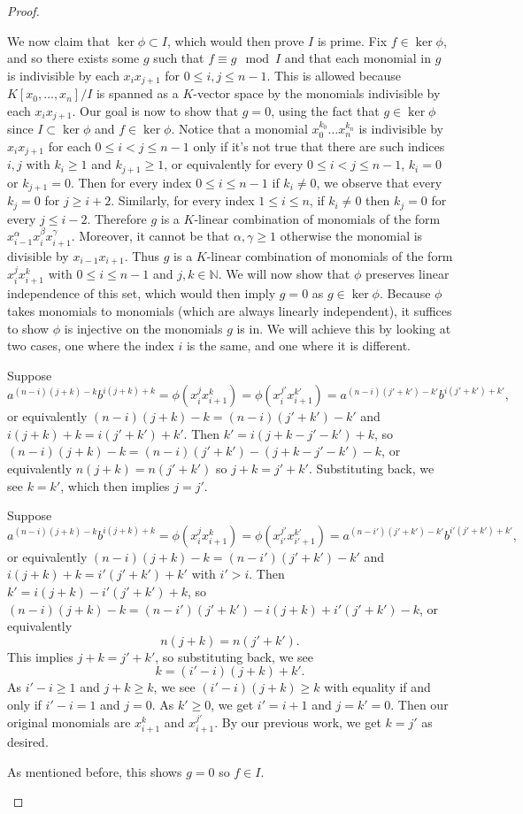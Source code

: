 \documentclass{article}
\newcommand{\N}{\mathbb{N}}
\theoremstyle{definition} %
\begin{document}
\begin{proof}
\begin{enumerate}[(a)]
        We now claim that $\ker \phi \subset I$, which would then prove $I$ is prime. Fix $f\in \ker \phi$, and so there exists some $g$ such that $f\equiv g \mod I$ and that each monomial in $g$ is indivisible by each $x_ix_{j+1}$ for $0\le i,j\le n-1$. This is allowed because $K[x_0,\dots, x_n]/I$ is spanned as a $K$-vector space by the monomials indivisible by each $x_ix_{j+1}$. Our goal is now to show that $g=0$, using the fact that $g\in \ker \phi$ since $I\subset \ker \phi$ and $f\in \ker \phi$. Notice that a monomial $x_0^{k_0} \dots x_n ^{k_n}$ is indivisible by $x_i x_{j+1}$ for each $0\le i < j \le n-1$ only if it's not true that there are such indices $i,j$ with $k_i \ge 1$ and $k_{j+1}\ge 1$, or equivalently for every $0\le i<j\le n-1$, $k_i = 0$ or $k_{j+1}=0$. Then for every index $0\le i \le n-1$ if $k_i\ne 0$, we observe that every $k_j=0$ for $j\ge i+2$. Similarly, for every index $1\le i \le n$, if $k_i \ne 0$ then $k_j = 0$ for every $j\le i-2$. Therefore $g$ is a $K$-linear combination of monomials of the form $x_{i-1}^ \alpha x_i ^\beta x_{i+1}^\gamma$. Moreover, it cannot be that $\alpha, \gamma \ge 1$ otherwise the monomial is divisible by $x_{i-1} x_{i+1}$. Thus $g$ is a $K$-linear combination of monomials of the form $x_i^j x_{i+1}^k$ with $0\le i \le n-1$ and $j,k \in \N$. We will now show that $\phi$ preserves linear independence of this set, which would then imply $g=0$ as $g\in \ker \phi$. Because $\phi$ takes monomials to monomials (which are always linearly independent), it suffices to show $\phi$ is injective on the monomials $g$ is in. We will achieve this by looking at two cases, one where the index $i$ is the same, and one where it is different.

        \vspace{0.1in}
        Suppose \[
        a^{(n-i)(j+k)-k}b^{i(j+k)+k}=\phi(x_i^j x_{i+1}^k)= \phi(x_i^{j'} x_{i+1}^{k'}) = a^{(n-i)(j'+k')-k'}b^{i(j'+k')+k'},
        \]
        or equivalently $(n-i)(j+k)-k = (n-i)(j'+k')-k'$ and $i(j+k)+k = i(j'+k')+k'$. Then $k'=i(j+k-j'-k')+k$, so $(n-i)(j+k)-k=(n-i)(j'+k')-(j+k-j'-k')-k$, or equivalently $n(j+k)=n(j'+k')$ so $j+k=j'+k'$. Substituting back, we see $k=k'$, which then implies $j=j'$.

        \vspace{0.1in}
        Suppose \[
        a^{(n-i)(j+k)-k}b^{i(j+k)+k}=\phi(x_i^j x_{i+1}^k)= \phi(x_{i'}^{j'} x_{i'+1}^{k'}) = a^{(n-i')(j'+k')-k'}b^{i'(j'+k')+k'},
        \]
        or equivalently $(n-i)(j+k)-k = (n-i')(j'+k')-k'$ and $i(j+k)+k = i'(j'+k')+k'$ with $i'>i$. Then $k'=i(j+k)-i'(j'+k')+k$, so $(n-i)(j+k)-k=(n-i')(j'+k')-i(j+k)+i'(j'+k')-k$, or equivalently $$n(j+k)=n(j'+k').$$ This implies $j+k=j'+k'$, so substituting back, we see $$k=(i'-i)(j+k)+k'.$$ As $i'-i\ge 1$ and $j+k\ge k$, we see $(i'-i)(j+k)\ge k$ with equality if and only if $i'-i=1$ and $j=0$. As $k'\ge 0$, we get $i'=i+1$ and $j=k'=0$. Then our original monomials are $x_{i+1}^k$ and $x_{i+1}^{j'}$. By our previous work, we get $k=j'$ as desired.

        \vspace{0.1in}
        As mentioned before, this shows $g=0$ so $f\in I$.
    \end{enumerate}
\end{proof}
\end{document}
